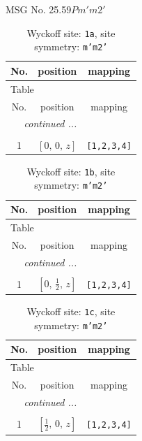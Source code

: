 \documentclass[fleqn,8pt]{jsarticle}
\begin{document}
\setcounter{MaxMatrixCols}{32}

\renewcommand{\tablename}{Table~}
\renewcommand{\figurename}{Figure~}
\begin{center}
\LARGE
MSG No. 25.59\quad$Pm'm2'$
\end{center}
\renewcommand{\arraystretch}{1.2}
\begin{longtable}{ccc}
\caption{Wyckoff site: {\tt 1a}, site symmetry: {\tt m'm2'}}
 \\
 \hline \hline
No. & position & mapping \\ \hline \endfirsthead

\multicolumn{2}{l}{\tablename\ \thetable{}} \\
 \hline \hline
No. & position & mapping \\ \hline \endhead

 \hline \hline
\multicolumn{2}{r}{\footnotesize\it continued ...} \\ \endfoot

 \hline \hline
\multicolumn{2}{r}{} \\ \endlastfoot

1 & $\left[ 0,\, 0,\, z \right]$ & {\tt [1,2,3,4]} \\
\end{longtable}
\renewcommand{\arraystretch}{1.2}
\begin{longtable}{ccc}
\caption{Wyckoff site: {\tt 1b}, site symmetry: {\tt m'm2'}}
 \\
 \hline \hline
No. & position & mapping \\ \hline \endfirsthead

\multicolumn{2}{l}{\tablename\ \thetable{}} \\
 \hline \hline
No. & position & mapping \\ \hline \endhead

 \hline \hline
\multicolumn{2}{r}{\footnotesize\it continued ...} \\ \endfoot

 \hline \hline
\multicolumn{2}{r}{} \\ \endlastfoot

1 & $\left[ 0,\, \frac{1}{2},\, z \right]$ & {\tt [1,2,3,4]} \\
\end{longtable}
\renewcommand{\arraystretch}{1.2}
\begin{longtable}{ccc}
\caption{Wyckoff site: {\tt 1c}, site symmetry: {\tt m'm2'}}
 \\
 \hline \hline
No. & position & mapping \\ \hline \endfirsthead

\multicolumn{2}{l}{\tablename\ \thetable{}} \\
 \hline \hline
No. & position & mapping \\ \hline \endhead

 \hline \hline
\multicolumn{2}{r}{\footnotesize\it continued ...} \\ \endfoot

 \hline \hline
\multicolumn{2}{r}{} \\ \endlastfoot

1 & $\left[ \frac{1}{2},\, 0,\, z \right]$ & {\tt [1,2,3,4]} \\
\end{longtable}
\end{document}
